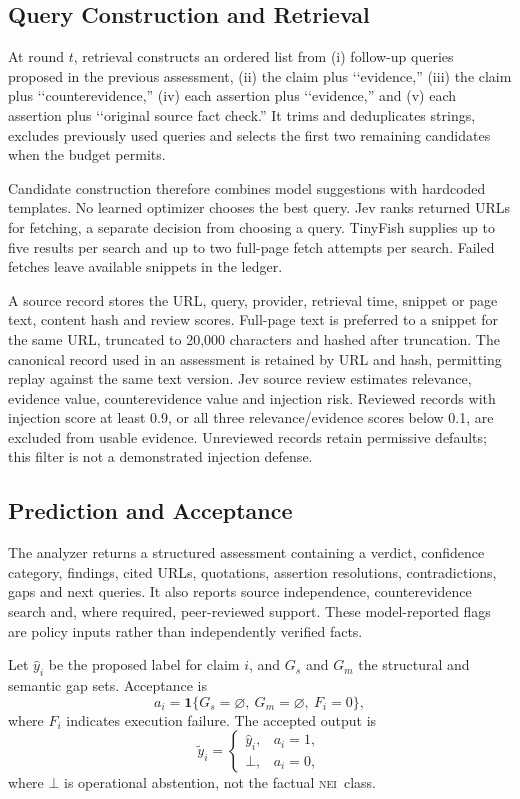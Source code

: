 \documentclass[conference]{IEEEtran}
\newcommand{\NEI}{\textsc{nei}}
\begin{document}
\subsection{Query Construction and Retrieval}
At round $t$, retrieval constructs an ordered list from (i) follow-up queries proposed in the previous assessment, (ii) the claim plus \lq\lq evidence,'' (iii) the claim plus \lq\lq counterevidence,'' (iv) each assertion plus \lq\lq evidence,'' and (v) each assertion plus \lq\lq original source fact check.'' It trims and deduplicates strings, excludes previously used queries and selects the first two remaining candidates when the budget permits.

Candidate construction therefore combines model suggestions with hardcoded templates. No learned optimizer chooses the best query. Jev ranks returned URLs for fetching, a separate decision from choosing a query. TinyFish supplies up to five results per search and up to two full-page fetch attempts per search. Failed fetches leave available snippets in the ledger.

A source record stores the URL, query, provider, retrieval time, snippet or page text, content hash and review scores. Full-page text is preferred to a snippet for the same URL, truncated to 20,000 characters and hashed after truncation. The canonical record used in an assessment is retained by URL and hash, permitting replay against the same text version. Jev source review estimates relevance, evidence value, counterevidence value and injection risk. Reviewed records with injection score at least 0.9, or all three relevance/evidence scores below 0.1, are excluded from usable evidence. Unreviewed records retain permissive defaults; this filter is not a demonstrated injection defense.

\subsection{Prediction and Acceptance}
The analyzer returns a structured assessment containing a verdict, confidence category, findings, cited URLs, quotations, assertion resolutions, contradictions, gaps and next queries. It also reports source independence, counterevidence search and, where required, peer-reviewed support. These model-reported flags are policy inputs rather than independently verified facts.

Let $\hat y_i$ be the proposed label for claim $i$, and $G_s$ and $G_m$ the structural and semantic gap sets. Acceptance is
\begin{equation}
a_i=\mathbf{1}\{G_s=\varnothing,\ G_m=\varnothing,\ F_i=0\},
\label{eq:acceptance}
\end{equation}
where $F_i$ indicates execution failure. The accepted output is
\begin{equation}
\tilde y_i =
\begin{cases}
\hat y_i, & a_i=1,\\
\bot, & a_i=0,
\end{cases}
\label{eq:selective}
\end{equation}
where $\bot$ is operational abstention, not the factual \NEI\ class.
\end{document}
